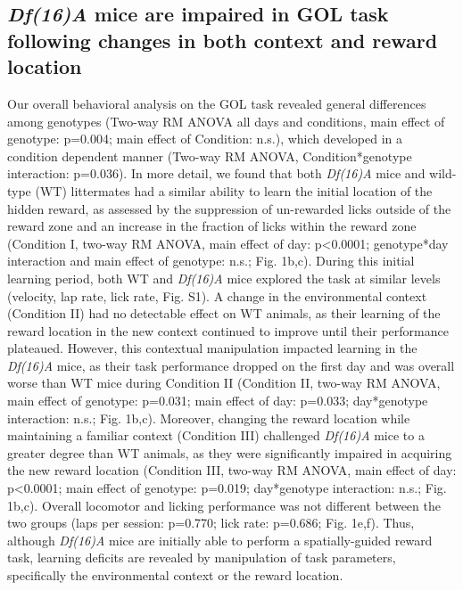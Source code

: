 \subsection{\emph{Df(16)A\super{+/-}} mice are impaired in GOL task following changes in both context and reward location}

Our overall behavioral analysis on the GOL task revealed general differences among genotypes (Two-way RM ANOVA all days and conditions, main effect of genotype: p=0.004; main effect of Condition: n.s.), which developed in a condition dependent manner (Two-way RM ANOVA, Condition*genotype interaction: p=0.036). In more detail, we found that both \emph{Df(16)A\super{+/-}} mice and wild-type (WT) littermates had a similar ability to learn the initial location of the hidden reward, as assessed by the suppression of un-rewarded licks outside of the reward zone and an increase in the fraction of licks within the reward zone (Condition I, two-way RM ANOVA, main effect of day: p<0.0001; genotype*day interaction and main effect of genotype: n.s.; Fig. 1b,c). During this initial learning period, both WT and \emph{Df(16)A\super{+/-}} mice explored the task at similar levels (velocity, lap rate, lick rate, Fig. S1). A change in the environmental context (Condition II) had no detectable effect on WT animals, as their learning of the reward location in the new context continued to improve until their performance plateaued. However, this contextual manipulation impacted learning in the \emph{Df(16)A\super{+/-}} mice, as their task performance dropped on the first day and was overall worse than WT mice during Condition II (Condition II, two-way RM ANOVA, main effect of genotype: p=0.031; main effect of day: p=0.033; day*genotype interaction: n.s.; Fig. 1b,c). Moreover, changing the reward location while maintaining a familiar context (Condition III) challenged \emph{Df(16)A\super{+/-}} mice to a greater degree than WT animals, as they were significantly impaired in acquiring the new reward location (Condition III, two-way RM ANOVA, main effect of day: p<0.0001; main effect of genotype: p=0.019; day*genotype interaction: n.s.; Fig. 1b,c). Overall locomotor and licking performance was not different between the two groups (laps per session: p=0.770; lick rate: p=0.686; Fig. 1e,f). Thus, although \emph{Df(16)A\super{+/-}} mice are initially able to perform a spatially-guided reward task, learning deficits are revealed by manipulation of task parameters, specifically the environmental context or the reward location.

